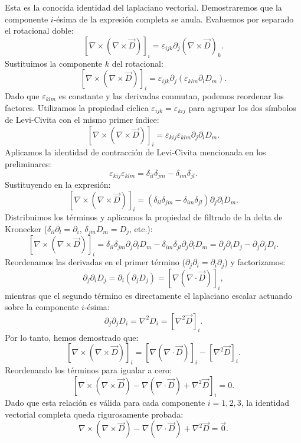 \documentclass[a4paper]{article}
\begin{document}
Esta es la conocida identidad del laplaciano vectorial. Demostraremos que la componente $i$-ésima de la expresión completa se anula. Evaluemos por separado el rotacional doble:
$$
[\nabla \times (\nabla \times \vec{D})]_i = \varepsilon_{ijk} \partial_j (\nabla \times \vec{D})_k.
$$
Sustituimos la componente $k$ del rotacional:
$$
[\nabla \times (\nabla \times \vec{D})]_i = \varepsilon_{ijk} \partial_j (\varepsilon_{klm} \partial_l D_m).
$$
Dado que $\varepsilon_{klm}$ es constante y las derivadas conmutan, podemos reordenar los factores. Utilizamos la propiedad cíclica $\varepsilon_{ijk} = \varepsilon_{kij}$ para agrupar los dos símbolos de Levi-Civita con el mismo primer índice:
$$
[\nabla \times (\nabla \times \vec{D})]_i = \varepsilon_{kij} \varepsilon_{klm} \partial_j \partial_l D_m.
$$
Aplicamos la identidad de contracción de Levi-Civita mencionada en los preliminares:
$$
\varepsilon_{kij} \varepsilon_{klm} = \delta_{il}\delta_{jm} - \delta_{im}\delta_{jl}.
$$
Sustituyendo en la expresión:
$$
[\nabla \times (\nabla \times \vec{D})]_i = (\delta_{il}\delta_{jm} - \delta_{im}\delta_{jl}) \partial_j \partial_l D_m.
$$
Distribuimos los términos y aplicamos la propiedad de filtrado de la delta de Kronecker ($\delta_{il} \partial_l = \partial_i$, $\delta_{jm} D_m = D_j$, etc.):
$$
[\nabla \times (\nabla \times \vec{D})]_i = \delta_{il}\delta_{jm} \partial_j \partial_l D_m - \delta_{im}\delta_{jl} \partial_j \partial_l D_m = \partial_j \partial_i D_j - \partial_j \partial_j D_i.
$$
Reordenamos las derivadas en el primer término ($\partial_j \partial_i = \partial_i \partial_j$) y factorizamos:
$$
\partial_j \partial_i D_j = \partial_i (\partial_j D_j) = [\nabla(\nabla \cdot \vec{D})]_i,
$$
mientras que el segundo término es directamente el laplaciano escalar actuando sobre la componente $i$-ésima:
$$
\partial_j \partial_j D_i = \nabla^2 D_i = [\nabla^2 \vec{D}]_i.
$$
Por lo tanto, hemos demostrado que:
$$
[\nabla \times (\nabla \times \vec{D})]_i = [\nabla(\nabla \cdot \vec{D})]_i - [\nabla^2 \vec{D}]_i.
$$
Reordenando los términos para igualar a cero:
$$
[\nabla \times (\nabla \times \vec{D}) - \nabla(\nabla \cdot \vec{D}) + \nabla^2 \vec{D}]_i = 0.
$$
Dado que esta relación es válida para cada componente $i = 1, 2, 3$, la identidad vectorial completa queda rigurosamente probada:
$$
\nabla \times (\nabla \times \vec{D}) - \nabla(\nabla \cdot \vec{D}) + \nabla^2 \vec{D} = \vec{0}.
$$
\end{document}
